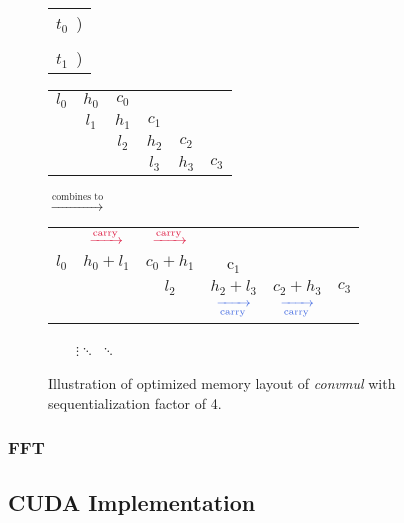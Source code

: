 \begin{figure}
  {
  \begin{center}
  \small
  \begin{tabular}{C{0.5cm}}
  \Large{\color{Crimson} $t_0$}~)\\\\
    \Large{\color{RoyalBlue} $t_1$}~)
\end{tabular}
  \begin{tabular}{cccccc}
    \color{Crimson}$l_0$ & \color{Crimson}$h_0$ & \color{Crimson}$c_0$ & & & \\
    & \color{Crimson}$l_1$ & \color{Crimson}$h_1$ & \color{Crimson}$c_1$ & & \\
    & & \color{RoyalBlue}$l_2$ & \color{RoyalBlue}$h_2$ & \color{RoyalBlue}$c_2$ & \\
    & & & \color{RoyalBlue}$l_3$ & \color{RoyalBlue}$h_3$ & \color{RoyalBlue}$c_3$
  \end{tabular}
$\xrightarrow{\text{combines to}}$
\begin{tabular}{cccccc}
     & $\xrightarrow{\scriptsize \color{Crimson} \text{carry}}$ & $\xrightarrow{\scriptsize \color{Crimson} \text{carry}}$ &  &  &  \\
    \color{Crimson}$l_0$ & \color{Crimson}$h_0 + l_1$ & \color{Crimson}$c_0 + h_1$ & \color{Crimson}c$_1$ & & \\
    & & \color{RoyalBlue}$l_2$ & \color{RoyalBlue}$h_2+l_3$ & \color{RoyalBlue}$c_2+h_3$ & \color{RoyalBlue} $c_3$\\
  & & & $\color{RoyalBlue}\xrightarrow[\scriptsize \text{carry}]{}$ & $\color{RoyalBlue}\xrightarrow[\scriptsize \text{carry}]{}$ & \\
\end{tabular}
\end{center}
}

~~~~$\vdots$\qquad\qquad\qquad\qquad\qquad $\ddots$ \qquad\qquad\qquad\qquad\qquad\qquad\qquad\qquad\qquad\qquad\qquad\qquad  $\ddots$
  \caption{\footnotesize Illustration of optimized memory layout of \textit{convmul} with sequentialization factor of 4.}
  \label{fig:muloptmem}
\end{figure}


\subsubsection{FFT}
\label{subsubsec:fft}

\subsection{CUDA Implementation}
\label{subsec:mulcud}


